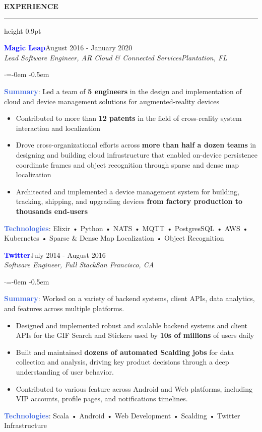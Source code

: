 \documentclass[
    11pt, %
]{resume} %
\newenvironment{rSectionCustom}[1]{
  \Large
  \sectionskip
  \textbf{\textcolor{Cerulean}{\MakeUppercase{#1}}}
  \vspace{0.5em}
  {\color{Blue}\hrule height 0.9pt}
  \vspace{0.25em}

  \begin{list}{}{
    \setlength{\leftmargin}{1.5em}
  }
  \item[]
}{
    \vspace{1em}
    \end{list}
}
\newenvironment{rSubsection2}[4]{
  \normalsize
  \hspace{-18pt}\textcolor{Blue}{\textbf{\large #1}}\hfill{#2}
  \\
  \hspace*{-18pt}\emph{#3}\hfill\emph{#4}
  \begin{list}{$\cdot$}{\leftmargin=-0em}
  \itemsep -0.5em \vspace{-0.25em}
}{
    \vspace{1em}
    \end{list}
}
\begin{document}
\begin{rSectionCustom}{Experience}
    \begin{rSubsection2}{Magic Leap}{August 2016 - January 2020}{Lead Software Engineer, AR Cloud \& Connected Services}{Plantation, FL}
        \item[] \textcolor{RoyalBlue}{\textbf{Summary}}: Led a team of \textbf{5 engineers} in the design and implementation of cloud and device management solutions for augmented-reality devices
        \begin{itemize}[leftmargin=*]
            \item Contributed to more than \textbf{12 patents} in the field of cross-reality system interaction and localization
            \item Drove cross-organizational efforts across \textbf{more than half a dozen teams} in designing and building cloud infrastructure that enabled on-device persistence coordinate frames and object recognition through sparse and dense map localization
            \item Architected and implemented a device management system for building, tracking, shipping, and upgrading devices \textbf{from factory production to thousands end-users}
            \end{itemize}
        \vspace{0.5em}
        \item[] \textcolor{RoyalBlue}{\textbf{Technologies}}: Elixir • Python • NATS • MQTT • PostgresSQL • AWS • Kubernetes • Sparse \& Dense Map Localization • Object Recognition
    \end{rSubsection2}

    \begin{rSubsection2}{Twitter}{July 2014 - August 2016}{Software Engineer, Full Stack}{San Francisco, CA}
        \item[] \textcolor{RoyalBlue}{\textbf{Summary}}: Worked on a variety of backend systems, client APIs, data analytics, and features across multiple platforms.
        \begin{itemize}[leftmargin=*]
            \item Designed and implemented robust and scalable backend systems and client APIs for the GIF Search and Stickers used by \textbf{10s of millions} of users daily
            \item Built and maintained \textbf{dozens of automated Scalding jobs} for data collection and analysis, driving key product decisions through a deep understanding of user behavior.
            \item Contributed to various feature across Android and Web platforms, including VIP accounts, profile pages, and notifications timelines.
            \end{itemize}
        \vspace{0.5em}
        \item[] \textcolor{RoyalBlue}{\textbf{Technologies}}: Scala • Android • Web Development • Scalding • Twitter Infrastructure
    \end{rSubsection2}


\end{rSectionCustom}
\end{document}
